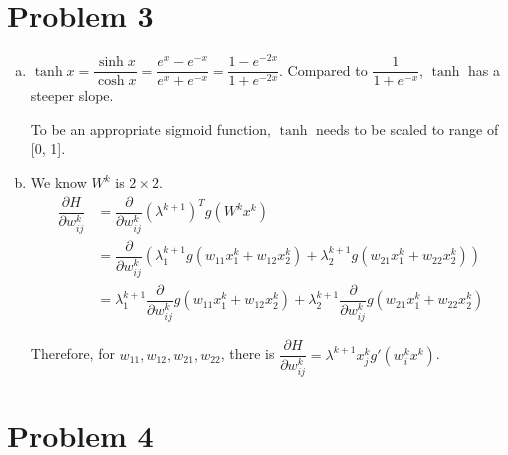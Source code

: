 \documentclass[10pt]{article}
\begin{document}
\section*{Problem 3}
\begin{enumerate}[(a)]

\item  $\tanh x = \dfrac{\sinh x}{\cosh x} = \dfrac{e^x - e^{-x}}{e^x
+ e^{-x}} = \dfrac{1 - e^{-2x}}{1 + e^{-2x}}$. Compared to $\dfrac{1}{1
+ e^{-x}}$, $\tanh$ has a steeper slope.

To be an appropriate sigmoid function, $\tanh$ needs to be scaled to
range of [0, 1].

\item We know $W^k$ is $2 \times 2$.
\begin{align}
\dfrac{\partial H}{\partial w_{ij}^k} &= \dfrac{\partial}{\partial
w_{ij}^k} (\lambda^{k+1})^T g(W^kx^k)\\
&= \dfrac{\partial}{\partial w_{ij}^k} (\lambda_1^{k+1} g(w_{11}x_1^k
+ w_{12}x_2^k) + \lambda_2^{k+1} g(w_{21}x_1^k + w_{22}x_2^k))\\
&= \lambda_1^{k+1} \dfrac{\partial}{\partial w_{ij}^k} g(w_{11}x_1^k
+ w_{12}x_2^k) + \lambda_2^{k+1} \dfrac{\partial}{\partial w_{ij}^k}
g(w_{21}x_1^k + w_{22}x_2^k)
\end{align}

Therefore, for $w_{11}, w_{12}, w_{21}, w_{22}$, there is
$\dfrac{\partial H}{\partial w_{ij}^k} = \lambda^{k+1} x_j^k g'(w_i^k x^k)$.

\end{enumerate}

\section*{Problem 4}
\end{document}
